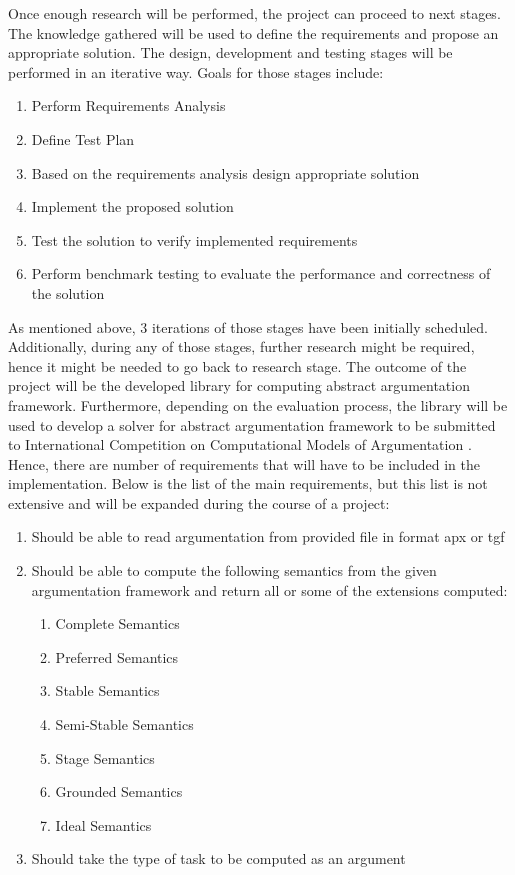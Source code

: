 Once enough research will be performed, the project can proceed to next stages. The knowledge gathered will be used to define the requirements and propose an appropriate solution. The design, development and testing stages will be performed in an iterative way. Goals for those stages include:
\begin{enumerate}
	\item{Perform Requirements Analysis}
	\item{Define Test Plan}
	\item{Based on the requirements analysis design appropriate solution} 
	\item{Implement the proposed solution}
	\item{Test the solution to verify implemented requirements}
	\item{Perform benchmark testing to evaluate the performance and correctness of the solution}
\end{enumerate}
As mentioned above, 3 iterations of those stages have been initially scheduled. Additionally, during any of those stages, further research might be required, hence it might be needed to go back to research stage.
\newline
The outcome of the project will be the developed library for computing abstract argumentation framework. Furthermore, depending on the evaluation process, the library will be used to develop a solver for abstract argumentation framework to be submitted to International Competition on Computational Models of Argumentation \citep{ICCMA}. Hence, there are number of requirements that will have to be included in the implementation. Below is the list of the main requirements, but this list is not extensive and will be expanded during the course of a project:
\begin{enumerate}
	\item{Should be able to read argumentation from provided file in format apx or tgf}
	\item{Should be able to compute the following semantics from the given argumentation framework and return all or some of the extensions computed:}
		\begin{enumerate}
			\item{Complete Semantics}
			\item{Preferred Semantics}
			\item{Stable Semantics}
			\item{Semi-Stable Semantics}
			\item{Stage Semantics}
			\item{Grounded Semantics}
			\item{Ideal Semantics}
		\end{enumerate}
	\item{Should take the type of task to be computed as an argument}
\end{enumerate}
